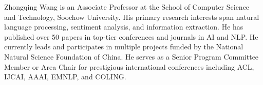 Zhongqing Wang is an Associate Professor at the School of Computer Science and Technology, Soochow University. His primary research interests span natural language processing, sentiment analysis, and information extraction. He has published over 50 papers in top-tier conferences and journals in AI and NLP. He currently leads and participates in multiple projects funded by the National Natural Science Foundation of China. He serves as a Senior Program Committee Member or Area Chair for prestigious international conferences including ACL, IJCAI, AAAI, EMNLP, and COLING.
